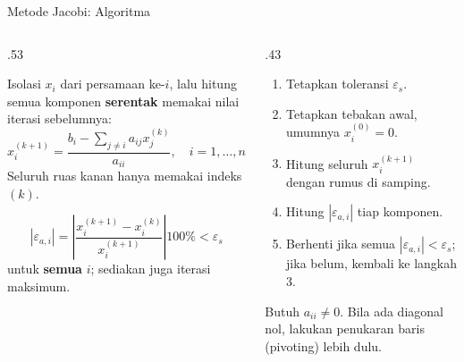 \documentclass[aspectratio=169,10pt]{beamer}
\begin{document}
\begin{frame}{Metode Jacobi: Algoritma}
\scriptsize
\begin{columns}[T,totalwidth=\textwidth]
\begin{column}{.53\textwidth}
\begin{bluebox}[Ide]
Isolasi $x_i$ dari persamaan ke-$i$, lalu hitung semua komponen \textbf{serentak} memakai nilai iterasi sebelumnya:
\[
x_i^{(k+1)}=\frac{b_i-\sum_{j\neq i}a_{ij}x_j^{(k)}}{a_{ii}},\quad i=1,\dots,n.
\]
Seluruh ruas kanan hanya memakai indeks $(k)$.
\end{bluebox}
\begin{orangebox}
\[
|\varepsilon_{a,i}|=\left|\frac{x_i^{(k+1)}-x_i^{(k)}}{x_i^{(k+1)}}\right|100\%<\varepsilon_s
\]
untuk \textbf{semua} $i$; sediakan juga iterasi maksimum.
\end{orangebox}
\end{column}
\begin{column}{.43\textwidth}
\begin{greenbox}[Langkah]
\begin{enumerate}\setlength\itemsep{2pt}
\item Tetapkan toleransi $\varepsilon_s$.
\item Tetapkan tebakan awal, umumnya $x_i^{(0)}=0$.
\item Hitung seluruh $x_i^{(k+1)}$ dengan rumus di samping.
\item Hitung $|\varepsilon_{a,i}|$ tiap komponen.
\item Berhenti jika semua $|\varepsilon_{a,i}|<\varepsilon_s$; jika belum, kembali ke langkah 3.
\end{enumerate}
\end{greenbox}
\begin{goldbox}[Catatan]
Butuh $a_{ii}\neq0$. Bila ada diagonal nol, lakukan penukaran baris (pivoting) lebih dulu.
\end{goldbox}
\end{column}
\end{columns}
\end{frame}
\end{document}
